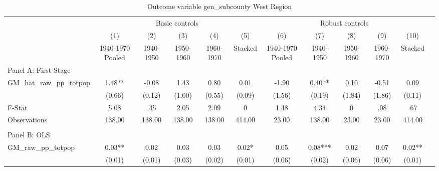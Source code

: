  \begin{table}[htbp]\centering {} \begin{threeparttable} \caption{Outcome variable gen\_subcounty West Region} \begin{tabular}{l*{11}{c}} \toprule
          &\multicolumn{5}{c}{Basic controls}                                   &\multicolumn{5}{c}{Robust controls}                                  \\\cmidrule(lr){2-6}\cmidrule(lr){7-11}
          &\multicolumn{1}{c}{(1)}&\multicolumn{1}{c}{(2)}&\multicolumn{1}{c}{(3)}&\multicolumn{1}{c}{(4)}&\multicolumn{1}{c}{(5)}&\multicolumn{1}{c}{(6)}&\multicolumn{1}{c}{(7)}&\multicolumn{1}{c}{(8)}&\multicolumn{1}{c}{(9)}&\multicolumn{1}{c}{(10)}\\
          &\multicolumn{1}{c}{1940-1970 Pooled}&\multicolumn{1}{c}{1940-1950}&\multicolumn{1}{c}{1950-1960}&\multicolumn{1}{c}{1960-1970}&\multicolumn{1}{c}{Stacked}&\multicolumn{1}{c}{1940-1970 Pooled}&\multicolumn{1}{c}{1940-1950}&\multicolumn{1}{c}{1950-1960}&\multicolumn{1}{c}{1960-1970}&\multicolumn{1}{c}{Stacked}\\
\cmidrule(lr){1-11}
\multicolumn{10}{l}{Panel A: First Stage}\\
\cmidrule(lr){1-11}
GM\_hat\_raw\_pp\_totpop&      1.48** &     -0.08   &      1.43   &      0.80   &      0.01   &     -1.90   &      0.40** &      0.10   &     -0.51   &      0.09   \\
          &    (0.66)   &    (0.12)   &    (1.00)   &    (0.55)   &    (0.09)   &    (1.56)   &    (0.19)   &    (1.84)   &    (1.86)   &    (0.11)   \\
\midrule
F-Stat    &      5.08   &       .45   &      2.05   &      2.09   &         0   &      1.48   &      4.34   &         0   &       .08   &       .67   \\
Observations&    138.00   &    138.00   &    138.00   &    138.00   &    414.00   &     23.00   &    138.00   &     23.00   &     23.00   &    414.00   \\
\cmidrule[\heavyrulewidth](lr){1-11} \\ \cmidrule[\heavyrulewidth](lr){1-11}
\multicolumn{10}{l}{Panel B: OLS}\\
\cmidrule(lr){1-11}
GM\_raw\_pp\_totpop&      0.03** &      0.02   &      0.03   &      0.03   &      0.02*  &      0.05   &      0.08***&      0.02   &      0.07   &      0.02** \\
          &    (0.01)   &    (0.01)   &    (0.03)   &    (0.02)   &    (0.01)   &    (0.06)   &    (0.02)   &    (0.06)   &    (0.06)   &    (0.01)   \\

\end{tabular}
\end{threeparttable}
\end{table}

